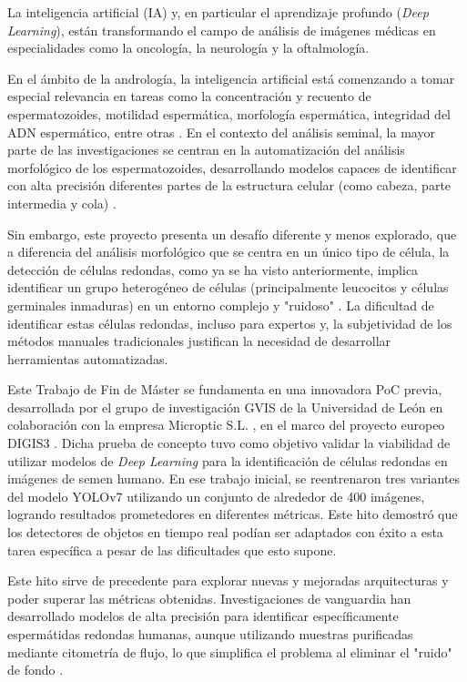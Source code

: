 \documentclass[12pt,a4paper,onecolumn,oneside]{report}
\begin{document}
La inteligencia artificial (IA) y, en particular el aprendizaje profundo (\textit{Deep Learning}), están transformando el campo de análisis de imágenes médicas en especialidades como la oncología, la neurología y la oftalmología.

En el ámbito de la andrología, la inteligencia artificial está comenzando a tomar especial relevancia en tareas como la concentración y recuento de espermatozoides, motilidad espermática, morfología espermática, integridad del ADN espermático, entre otras \cite{PannerSelvam}. En el contexto del análisis seminal, la mayor parte de las investigaciones se centran
en la automatización del análisis morfológico de los espermatozoides, desarrollando modelos capaces de identificar con alta precisión diferentes partes de la estructura celular (como cabeza, parte intermedia y cola) \cite{Maalej2025}.

Sin embargo, este proyecto presenta un desafío diferente y menos explorado, que a diferencia del análisis morfológico que se centra en un único tipo de célula,
la detección de células redondas, como ya se ha visto anteriormente, implica identificar un grupo heterogéneo de células (principalmente leucocitos y células germinales inmaduras) en un entorno complejo y "ruidoso" \cite{OMS}\cite{BJBS}.
La dificultad de identificar estas células redondas, incluso para expertos y, la subjetividad de los métodos manuales tradicionales \cite{Johanisson2000} justifican la necesidad de desarrollar herramientas automatizadas.

Este Trabajo de Fin de Máster se fundamenta en una innovadora PoC previa, desarrollada por el grupo de investigación GVIS de la Universidad de León en colaboración con la empresa Microptic S.L. \cite{microptic}, en el marco del proyecto europeo DIGIS3 \cite{digis3}. 
Dicha prueba de concepto tuvo como objetivo validar la viabilidad de utilizar modelos de \textit{Deep Learning} para la identificación de células redondas en imágenes de semen humano. En ese trabajo inicial, se reentrenaron tres variantes del modelo YOLOv7 utilizando un conjunto de 
alrededor de 400 imágenes, logrando resultados prometedores en diferentes métricas. Este hito demostró que los detectores de objetos en tiempo real podían ser adaptados con éxito a esta tarea específica a pesar de las dificultades que esto supone.

Este hito sirve de precedente para explorar nuevas y mejoradas arquitecturas y poder superar las métricas obtenidas. Investigaciones de vanguardia han desarrollado modelos de alta precisión para identificar específicamente espermátidas redondas humanas, 
aunque utilizando muestras purificadas mediante citometría de flujo, lo que simplifica el problema al eliminar el "ruido" de fondo \cite{roundsCellsSpermatid}.
\end{document}
